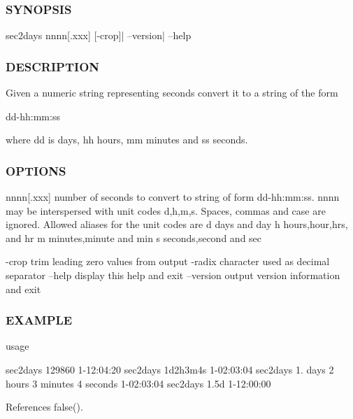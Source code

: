 \subsubsection*{S\+Y\+N\+O\+P\+S\+IS}

\begin{DoxyVerb}sec2days nnnn[.xxx] [-crop]| --version| --help
\end{DoxyVerb}


\subsubsection*{D\+E\+S\+C\+R\+I\+P\+T\+I\+ON}

Given a numeric string representing seconds convert it to a string of the form

dd-\/hh\+:mm\+:ss

where dd is days, hh hours, mm minutes and ss seconds.

\subsubsection*{O\+P\+T\+I\+O\+NS}

nnnn\mbox{[}.xxx\mbox{]} number of seconds to convert to string of form dd-\/hh\+:mm\+:ss. nnnn may be interspersed with unit codes d,h,m,s. Spaces, commas and case are ignored. Allowed aliases for the unit codes are d days and day h hours,hour,hrs, and hr m minutes,minute and min s seconds,second and sec

-\/crop trim leading zero values from output -\/radix character used as decimal separator --help display this help and exit --version output version information and exit

\subsubsection*{E\+X\+A\+M\+P\+LE}

usage

sec2days 129860 1-\/12\+:04\+:20 sec2days 1d2h3m4s 1-\/02\+:03\+:04 sec2days 1. days 2 hours 3 minutes 4 seconds 1-\/02\+:03\+:04 sec2days 1.\+5d 1-\/12\+:00\+:00 

References false().

